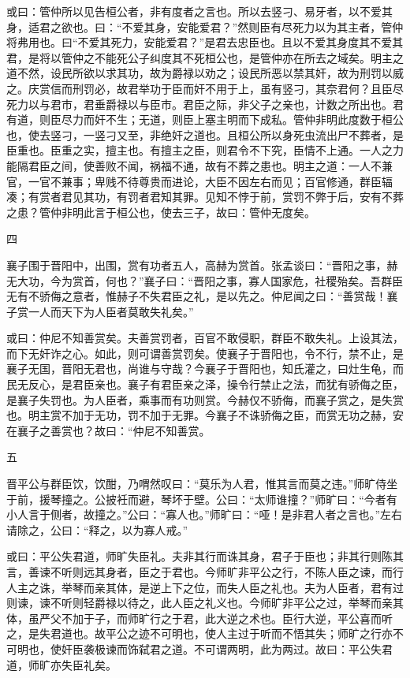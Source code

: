 \documentclass[]{article}
\begin{document}
或曰：管仲所以见告桓公者，非有度者之言也。所以去竖刁、易牙者，以不爱其身，适君之欲也。曰：``不爱其身，安能爱君？''然则臣有尽死力以为其主者，管仲将弗用也。曰``不爱其死力，安能爱君？''是君去忠臣也。且以不爱其身度其不爱其君，是将以管仲之不能死公子纠度其不死桓公也，是管仲亦在所去之域矣。明主之道不然，设民所欲以求其功，故为爵禄以劝之；设民所恶以禁其奸，故为刑罚以威之。庆赏信而刑罚必，故君举功于臣而奸不用于上，虽有竖刁，其奈君何？且臣尽死力以与君市，君垂爵禄以与臣市。君臣之际，非父子之亲也，计数之所出也。君有道，则臣尽力而奸不生；无道，则臣上塞主明而下成私。管仲非明此度数于桓公也，使去竖刁，一竖刁又至，非绝奸之道也。且桓公所以身死虫流出尸不葬者，是臣重也。臣重之实，擅主也。有擅主之臣，则君令不下究，臣情不上通。一人之力能隔君臣之间，使善败不闻，祸福不通，故有不葬之患也。明主之道：一人不兼官，一官不兼事；卑贱不待尊贵而进论，大臣不因左右而见；百官修通，群臣辐凑；有赏者君见其功，有罚者君知其罪。见知不悖于前，赏罚不弊于后，安有不葬之患？管仲非明此言于桓公也，使去三子，故曰：管仲无度矣。

四

襄子围于晋阳中，出围，赏有功者五人，高赫为赏首。张孟谈曰：``晋阳之事，赫无大功，今为赏首，何也？''襄子曰：``晋阳之事，寡人国家危，社稷殆矣。吾群臣无有不骄侮之意者，惟赫子不失君臣之礼，是以先之。仲尼闻之曰：``善赏哉！襄子赏一人而天下为人臣者莫敢失礼矣。''

或曰：仲尼不知善赏矣。夫善赏罚者，百官不敢侵职，群臣不敢失礼。上设其法，而下无奸诈之心。如此，则可谓善赏罚矣。使襄子于晋阳也，令不行，禁不止，是襄子无国，晋阳无君也，尚谁与守哉？今襄子于晋阳也，知氏灌之，曰灶生龟，而民无反心，是君臣亲也。襄子有君臣亲之泽，操令行禁止之法，而犹有骄侮之臣，是襄子失罚也。为人臣者，乘事而有功则赏。今赫仅不骄侮，而襄子赏之，是失赏也。明主赏不加于无功，罚不加于无罪。今襄子不诛骄侮之臣，而赏无功之赫，安在襄子之善赏也？故曰：``仲尼不知善赏。

五

晋平公与群臣饮，饮酣，乃喟然叹曰：``莫乐为人君，惟其言而莫之违。''师旷侍坐于前，援琴撞之。公披衽而避，琴坏于壁。公曰：``太师谁撞？''师旷曰：``今者有小人言于侧者，故撞之。''公曰：``寡人也。''师旷曰：``哑！是非君人者之言也。''左右请除之，公曰：``释之，以为寡人戒。''

或曰：平公失君道，师旷失臣礼。夫非其行而诛其身，君子于臣也；非其行则陈其言，善谏不听则远其身者，臣之于君也。今师旷非平公之行，不陈人臣之谏，而行人主之诛，举琴而亲其体，是逆上下之位，而失人臣之礼也。夫为人臣者，君有过则谏，谏不听则轻爵禄以待之，此人臣之礼义也。今师旷非平公之过，举琴而亲其体，虽严父不加于子，而师旷行之于君，此大逆之术也。臣行大逆，平公喜而听之，是失君道也。故平公之迹不可明也，使人主过于听而不悟其失；师旷之行亦不可明也，使奸臣袭极谏而饰弑君之道。不可谓两明，此为两过。故曰：平公失君道，师旷亦失臣礼矣。
\end{document}

